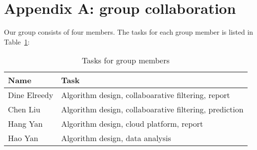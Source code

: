 \clearpage
\section*{Appendix A: group collaboration}
Our group consists of four members. The tasks for each group member is listed in Table~\ref{tab:group}:
\begin{table}[!ht]
  \centering
  \begin{tabular}{|p{5cm}|p{8cm}|}
    \hline
    Name  & Task\\
    \hline
    Dine Elreedy & Algorithm design, collaboarative filtering, report\\
    \hline
    Chen Liu & Algorithm design, collaboarative filtering, prediction\\
    \hline
    Hang Yan & Algorithm design, cloud platform, report\\
    \hline
    Hao Yan & Algorithm design, data analysis\\
    \hline
  \end{tabular}
  \caption{Tasks for group members}
  \label{tab:group}
\end{table}
